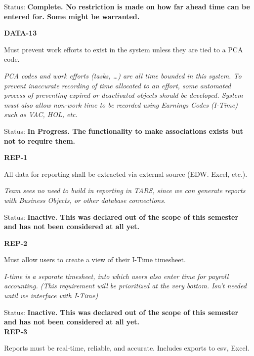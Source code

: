 Status: \textbf{Complete.  No restriction is made on how far ahead time can be entered for.  Some  might be warranted.}\\

\noindent 

\noindent \textbf{DATA-13}

\noindent Must prevent work efforts to exist in the system unless they are tied to a PCA code.

\noindent \textit{ PCA codes and work efforts (tasks, \dots ) are all time bounded in this system. To prevent inaccurate recording of time allocated to an effort, some automated process of preventing expired or deactivated objects should be developed. System must also allow non-work time to be recorded using Earnings Codes (I-Time) such as VAC, HOL, etc.}

\noindent Status: \textbf{In Progress.  The functionality to make associations exists but not to require them.}\\

\noindent 

\noindent \textbf{REP-1}

\noindent All data for reporting shall be extracted via external source (EDW. Excel, etc.).

\noindent \textit{Team sees no need to build in reporting in TARS, since we can generate reports with Business Objects, or other database connections. }

\noindent Status: \textbf{Inactive.   This was declared out of the scope of this semester and has not been considered at all yet.}\\

\noindent 

\noindent \textbf{REP-2}

\noindent Must allow users to create a view of their I-Time timesheet.

\noindent \textit{I-time is a separate timesheet, into which users also enter time for payroll accounting. (This requirement will be prioritized at the very bottom.  Isn't needed until we interface with I-Time)}

\noindent Status: \textbf{Inactive.   This was declared out of the scope of this semester and has not been considered at all yet.}\\

  

\noindent \textbf{REP-3}

\noindent Reports must be real-time, reliable, and accurate. Includes exports to csv, Excel.

